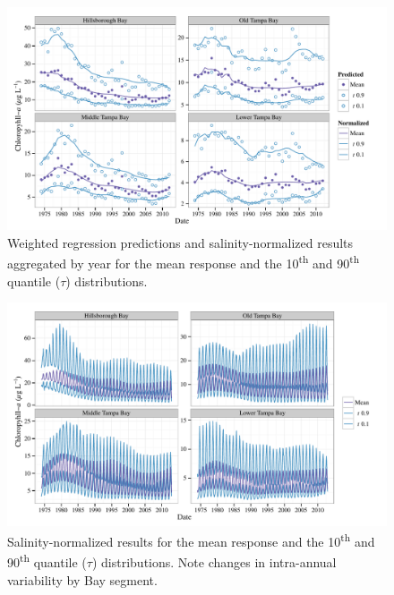 \documentclass{svjour3}\usepackage[]{graphicx}\usepackage[]{color}
\begin{document}
\begin{figure}[!ht]


{\centering \includegraphics[width=6in]{figssalnrm} 

}

\caption[Weighted regression predictions and salinity-normalized results aggregated by year for the mean response and the 10\textsuperscript{th} and 90\textsuperscript{th} quantile ($\tau$) distributions]{Weighted regression predictions and salinity-normalized results aggregated by year for the mean response and the 10\textsuperscript{th} and 90\textsuperscript{th} quantile ($\tau$) distributions.\label{fig:salnrm}}
\end{figure}



\begin{figure}[!ht]


{\centering \includegraphics[width=6in]{figssalnrm2} 

}

\caption[Salinity-normalized results for the mean response and the 10\textsuperscript{th} and 90\textsuperscript{th} quantile ($\tau$) distributions]{Salinity-normalized results for the mean response and the 10\textsuperscript{th} and 90\textsuperscript{th} quantile ($\tau$) distributions. Note changes in intra-annual variability by Bay segment.\label{fig:salnrm2}}
\end{figure}
\end{document}
